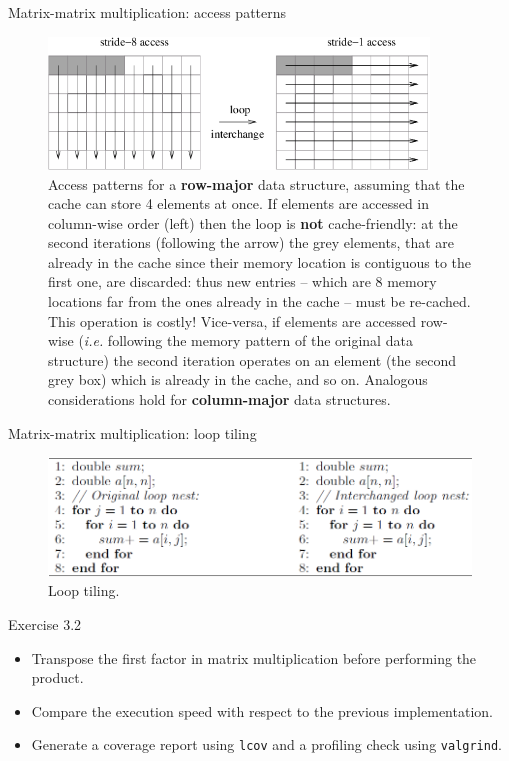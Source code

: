 \documentclass[10pt,aspectratio=169]{beamer}
\begin{document}
\begin{frame}{Matrix-matrix multiplication: access patterns}
    \begin{figure}
        \centering
        \includegraphics[width=0.9\textwidth]{images/access_patterns.png}
        \caption{Access patterns for a \textbf{row-major} data structure, assuming that the cache can store 4 elements at once. If elements are accessed in column-wise order (left) then the loop is \textbf{not} cache-friendly: at the second iterations (following the arrow) the grey elements, that are already in the cache since their memory location is contiguous to the first one, are discarded: thus new entries -- which are 8 memory locations far from the ones already in the cache -- must be re-cached. This operation is costly! Vice-versa, if elements are accessed row-wise (\textit{i.e.} following the memory pattern of the original data structure) the second iteration operates on an element (the second grey box) which is already in the cache, and so on. Analogous considerations hold for \textbf{column-major} data structures.}
    \end{figure}
\end{frame}

\begin{frame}{Matrix-matrix multiplication: loop tiling}
    \begin{figure}
        \centering
        \includegraphics[width=\textwidth]{images/loop_tiling.png}
        \caption{Loop tiling.}
    \end{figure}
\end{frame}

\begin{frame}{Exercise 3.2}
    \begin{itemize}
        \item Transpose the first factor in matrix multiplication before performing the product.
        \item Compare the execution speed with respect to the previous implementation.
        \item Generate a coverage report using \texttt{lcov} and a profiling check using \texttt{valgrind}.
    \end{itemize}
\end{frame}
\end{document}
